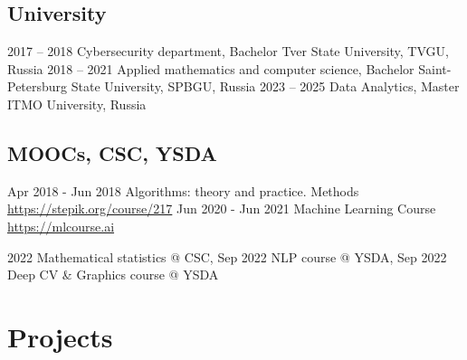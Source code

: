 \documentclass[11pt,a4paper]{moderncv}
\begin{document}
\subsection{University}
\cventry
{2017 -- 2018}
{Cybersecurity department, Bachelor}
{Tver State University, TVGU, Russia}
{}{}{}
\cventry
{2018 -- 2021}
{Applied mathematics and computer science, Bachelor}
{Saint-Petersburg State University, SPBGU, Russia}
{}{}{}
\cventry
{2023 -- 2025}
{Data Analytics, Master}
{ITMO University, Russia}
{}{}{}


\subsection{MOOCs, CSC, YSDA}
\cventry
{Apr 2018 - Jun 2018}
{Algorithms: theory and practice. Methods}
{}
{}{\newline\url{https://stepik.org/course/217}}{}
\cventry
{Jun 2020 - Jun 2021}
{Machine Learning Course}
{}
{}{\newline\url{https://mlcourse.ai}}{}

\cventry
{2022}
{Mathematical statistics @ CSC,}
{}
{}{}{}
\cventry
{Sep 2022}
{NLP course @ YSDA,}
{}
{}{}{}
\cventry
{Sep 2022}
{Deep CV \& Graphics course @ YSDA}
{}
{}{}{}









\pagebreak
\section{Projects}
\end{document}
